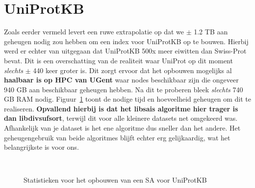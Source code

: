 \section{UniProtKB}\label{sec:uniprotkb}
Zoals eerder vermeld levert een ruwe extrapolatie op dat we $\pm$ 1.2 TB aan geheugen nodig zou hebben om een index voor UniProtKB op te bouwen.
Hierbij werd er echter van uitgegaan dat UniProtKB 500x meer eiwitten dan Swiss-Prot bevat.
Dit is een overschatting van de realiteit waar UniProt op dit moment \textit{slechts} $\pm$ 440 keer groter is.
Dit zorgt ervoor dat het opbouwen mogelijks al \textbf{haalbaar is op HPC van UGent} waar nodes beschikbaar zijn die ongeveer 940 GB aan beschikbaar geheugen hebben.
Na dit te proberen bleek \textit{slechts} 740 GB RAM nodig.
Figuur~\ref{fig:build_uniprot} toont de nodige tijd en hoeveelheid geheugen om dit te realiseren.
\textbf{Opvallend hierbij is dat het libsais algoritme hier trager is dan libdivsufsort}, terwijl dit voor alle kleinere datasets net omgekeerd was.
Afhankelijk van je dataset is het ene algoritme dus sneller dan het andere.
Het geheugengebruik van beide algoritmes blijft echter erg gelijkaardig, wat het belangrijkste is voor ons.
\\
\begin{figure}[H]
    \centering
    \\[4ex] %

    \caption{Statistieken voor het opbouwen van een SA voor UniProtKB}\label{fig:build_uniprot}
\end{figure}


